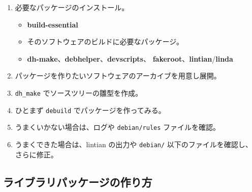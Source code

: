 \documentclass[mingoth,a4paper]{jsarticle}
\begin{document}
\begin{enumerate}
\item 必要なパッケージのインストール。
  \begin{itemize}
  \item \textbf{build-essential}
  \item そのソフトウェアのビルドに必要なパッケージ。
  \item \textbf{dh-make}、\textbf{debhelper}、\textbf{devscripts}、
      \textbf{fakeroot}、\textbf{lintian}/\textbf{linda}
  \end{itemize}
\item パッケージを作りたいソフトウェアのアーカイブを用意し展開。
\item \texttt{dh\_make} でソースツリーの雛型を作成。
\item ひとまず \texttt{debuild} でパッケージを作ってみる。
\item うまくいかない場合は、ログや \texttt{debian/rules} ファイルを確認。
\item うまくできた場合は、lintian の出力や
  \texttt{debian/} 以下のファイルを確認し、さらに修正。
\end{enumerate}


\subsection{ライブラリパッケージの作り方}
\end{document}
